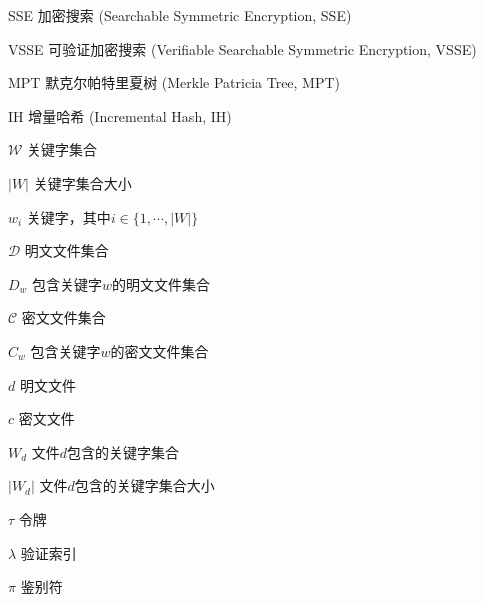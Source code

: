 \begin{denotation}[3cm]
\item[SSE] 加密搜索 (Searchable Symmetric Encryption, SSE)
\item[VSSE] 可验证加密搜索 (Verifiable Searchable Symmetric Encryption, VSSE)
\item[MPT] 默克尔帕特里夏树 (Merkle Patricia Tree, MPT)
\item[IH] 增量哈希 (Incremental Hash, IH)
\item[$\mathcal{W}$] 关键字集合
\item[$|W|$] 关键字集合大小
\item[$w_i$ ] 关键字，其中$i \in \{1, \cdots, |W|\}$
\item[$\mathcal{D}$] 明文文件集合
\item[$D_{w}$] 包含关键字$w$的明文文件集合
\item[$\mathcal{C}$] 密文文件集合
\item[$C_{w}$] 包含关键字$w$的密文文件集合
\item[$d$] 明文文件
\item[$c$] 密文文件
\item[$W_d$] 文件$d$包含的关键字集合
\item[$|W_d|$] 文件$d$包含的关键字集合大小
\item[$\tau$]	令牌
\item[$\lambda$] 验证索引
\item[$\pi$] 鉴别符
\end{denotation}
